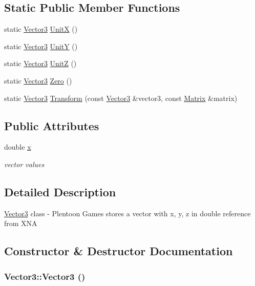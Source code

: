 \subsection*{Static Public Member Functions}
\begin{CompactItemize}
\item 
static \hyperlink{class_vector3}{Vector3} \hyperlink{class_vector3_8967211f669da76a8c56761e0fed00a5}{UnitX} ()
\item 
static \hyperlink{class_vector3}{Vector3} \hyperlink{class_vector3_f35f3d7a50ca12ff28bbaaec3c94c53d}{UnitY} ()
\item 
static \hyperlink{class_vector3}{Vector3} \hyperlink{class_vector3_423c3c9c3848e16f0a6add16559f995b}{UnitZ} ()
\item 
static \hyperlink{class_vector3}{Vector3} \hyperlink{class_vector3_596774f76ffa9334516e14065daa8902}{Zero} ()
\item 
static \hyperlink{class_vector3}{Vector3} \hyperlink{class_vector3_fd31dba5d2ea99d6da03b2fd220847f5}{Transform} (const \hyperlink{class_vector3}{Vector3} \&vector3, const \hyperlink{class_matrix}{Matrix} \&matrix)
\end{CompactItemize}
\subsection*{Public Attributes}
\begin{CompactItemize}
\item 
\hypertarget{class_vector3_60aa84ebc037dec9faba617f8ddb231d}{
double \hyperlink{class_vector3_60aa84ebc037dec9faba617f8ddb231d}{x}}
\label{class_vector3_60aa84ebc037dec9faba617f8ddb231d}

\begin{CompactList}\small\item\em vector values \item\end{CompactList}\end{CompactItemize}


\subsection{Detailed Description}
\hyperlink{class_vector3}{Vector3} class - Plentoon Games stores a vector with x, y, z in double reference from XNA 

\subsection{Constructor \& Destructor Documentation}
\hypertarget{class_vector3_0f49191f7e001e7f7ae1cb49522118b4}{
\subsubsection[Vector3]{\setlength{\rightskip}{0pt plus 5cm}Vector3::Vector3 ()}}
\label{class_vector3_0f49191f7e001e7f7ae1cb49522118b4}


